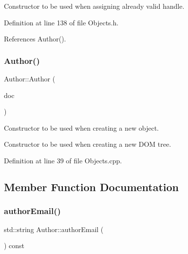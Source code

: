 Constructor to be used when assigning already valid handle. 



Definition at line 138 of file Objects.\+h.



References Author().

\hypertarget{class_d_d4hep_1_1_geometry_1_1_author_a9b8aae7585fe19fce420630f7fdd0d55}{}\label{class_d_d4hep_1_1_geometry_1_1_author_a9b8aae7585fe19fce420630f7fdd0d55} 
\subsubsection{\texorpdfstring{Author()}{Author()}\hspace{0.1cm}{\footnotesize\ttfamily [4/4]}}
{\footnotesize\ttfamily Author\+::\+Author (\begin{DoxyParamCaption}\item[{\hyperlink{class_d_d4hep_1_1_geometry_1_1_l_c_d_d}{L\+C\+DD} \&}]{doc }\end{DoxyParamCaption})}



Constructor to be used when creating a new object. 

Constructor to be used when creating a new D\+OM tree. 

Definition at line 39 of file Objects.\+cpp.



\subsection{Member Function Documentation}
\hypertarget{class_d_d4hep_1_1_geometry_1_1_author_ab64f51f7009764bbd3ca46b758302099}{}\label{class_d_d4hep_1_1_geometry_1_1_author_ab64f51f7009764bbd3ca46b758302099} 
\subsubsection{\texorpdfstring{author\+Email()}{authorEmail()}}
{\footnotesize\ttfamily std\+::string Author\+::author\+Email (\begin{DoxyParamCaption}{ }\end{DoxyParamCaption}) const}



